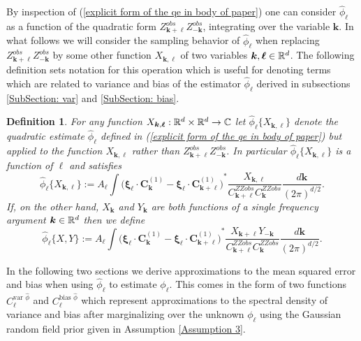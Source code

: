 \documentclass[10pt,noinfoline]{imsart}
\newtheorem{definition}{Definition}
\newcommand{\bs}{\boldsymbol}
\begin{document}
By inspection of (\ref{explicit form of the qe in body of paper}) one can consider $\hat\phi_{\bs \ell}$ as a function of the quadratic form  $Z^{obs}_{\bs k+\bs \ell}Z^{obs}_{-\bs k}$, integrating over the variable $\bs k$. In what follows we will consider the sampling behavior of $\hat\phi_{\bs \ell}$ when replacing $Z^{obs}_{\bs k+\bs \ell}Z^{obs}_{-\bs k}$ by some other function $X_{\bs k, \bs \ell}$ of two variables $\bs k,\bs\ell\in \Bbb R^d$. The following definition sets notation for this operation which is useful for denoting terms which are related to variance and bias of the estimator $\hat\phi_{\bs \ell}$ derived in subsections \ref{SubSection: var} and \ref{SubSection: bias}.

\begin{definition}
\label{def: quad est applied to X}
For any function $X_{\bs k, \bs \ell}:\Bbb R^d\times \Bbb R^d \rightarrow \Bbb C$ let
$\hat\phi_{\bs \ell}\{X_{\bs k,\bs \ell}\}$ denote the quadratic estimate $\hat\phi_{\bs \ell}$ defined in (\ref{explicit form of the qe in body of paper}) but applied to the function $X_{\bs k, \bs \ell}$ rather than $Z^{obs}_{\bs k+\bs \ell}Z^{obs}_{-\bs k}$. In particular $\hat\phi_{\bs \ell}\{X_{\bs k,\bs \ell}\}$ is a function of $\bs \ell$  and satisfies
\[
\hat\phi_{\bs \ell}\{X_{\bs k,\bs \ell}\}
:=A_{\bs \ell}
        \int
        {\Big(\bs\xi_{\bs \ell} \!\cdot\!\bs C^{{(1)}}_{\bs k} - \bs\xi_{\bs \ell} \!\cdot\!\bs C^{{(1)}}_{\bs k+\bs \ell}\Big)}^{\! *}
        \frac{X_{\bs k,\bs \ell}}{C^{ZZobs}_{\bs k+\bs \ell}C^{ZZobs}_{\bs k}}\frac{d\bs k}{{(2\pi)}^{d/2}}.
\]
If, on the other hand, $X_{\bs k}$ and $Y_{\bs k}$ are both functions of a single frequency argument $\bs k\in \Bbb R^d$ then  we define
\[
\hat\phi_{\bs \ell}\{X,\!Y\}
:=A_{\bs \ell}
        \int
        {\Big(\bs\xi_{\bs \ell} \!\cdot\!\bs C^{{(1)}}_{\bs k} - \bs\xi_{\bs \ell} \!\cdot\!\bs C^{{(1)}}_{\bs k+\bs \ell}\Big)}^{\! *}
        \frac{X_{\bs k+\bs \ell}Y_{-\bs k}}{C^{ZZobs}_{\bs k+\bs \ell}C^{ZZobs}_{\bs k}}\frac{d\bs k}{{(2\pi)}^{d/2}}.
\]
\end{definition}



In the following two sections we derive approximations to the mean squared error and bias when using $\hat\phi_{\bs \ell}$ to estimate $\phi_{\bs \ell}$. This comes in the form of two functions $C_{\bs \ell}^{\text{var }\hat\phi}$ and $C_{\bs \ell}^{\text{bias }\hat\phi}$ which represent approximations to the spectral density of variance and bias after marginalizing over the unknown $\phi_{\bs \ell}$ using the Gaussian random field prior given in Assumption \ref{Assumption 3}.
\end{document}
